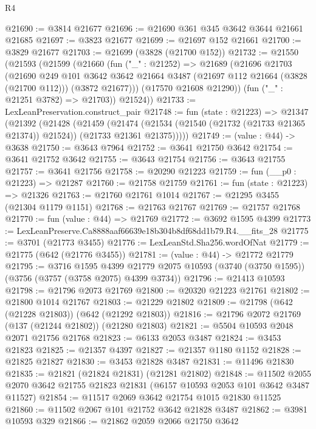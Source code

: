 \begin{lexlean}{R4}
\begin{coremodule}
@21690 := @3814 @21677
@21696 := @21690 @361 @345 @3642 @3644 @21661 @21685
@21697 := @3823 @21677
@21699 := @21697 @152 @21661
@21700 := @3829 @21677
@21703 := @21699 (@3828 (@21700 @152))
@21732 := @21550
    (@21593
      (@21599
        (@21660
          (fun ("_" : @21252) =>
          @21689
            (@21696
              @21703
              (@21690
                @249
                @101
                @3642
                @3642
                @21664
                @3487
                (@21697 @112 @21664 (@3828 (@21700 @112)))
                (@3872 @21677)))
            (@17570 @21608 @21290))
          (fun ("_" : @21251 @3782) => @21703))
        @21524))
@21733 := LexLeanPreservation.construct_pair
@21748 := fun (state : @21223) =>
  @21347
    (@21392
      (@21428
        (@21459
          (@21474
            (@21534 (@21540 (@21732 (@21733 @21365 @21374)) @21524))
            (@21733 @21361 @21375)))))
@21749 := (value : @44) -> @3638
@21750 := @3643 @7964
@21752 := @3641 @21750 @3642
@21754 := @3641 @21752 @3642
@21755 := @3643 @21754
@21756 := @3643 @21755
@21757 := @3641 @21756
@21758 := @20290 @21223
@21759 := fun (__p0 : @21223) => @21287
@21760 := @21758 @21759
@21761 := fun (state : @21223) => @21326
@21763 := @21760 @21761 @1014
@21767 := @21295 @3455 (@21304 @1179 @1151)
@21768 := @21763 @21767
@21769 := @21757 @21768
@21770 := fun (value : @44) => @21769
@21772 := @3692 @1595 @4399
@21773 := LexLeanPreserve.Ca8888aaf66639e18b304b8df68dd1b79.R4.__fits_28
@21775 := @3701 (@21773 @3455)
@21776 := LexLeanStd.Sha256.wordOfNat
@21779 := @21775 (@642 (@21776 @3455))
@21781 := (value : @44) -> @21772 @21779
@21795 := @3716
    @1595
    @4399
    @21779
    @2075
    @10593
    (@3740 (@3750 @1595))
    (@3756 (@3757 (@3758 @2075) @4399 @3734))
@21796 := @21413 @10593
@21798 := @21796 @2073 @21769
@21800 := @20320 @21223 @21761
@21802 := @21800 @1014 @21767
@21803 := @21229 @21802
@21809 := @21798 (@642 (@21228 @21803)) (@642 (@21292 @21803))
@21816 := @21796 @2072 @21769 (@137 (@21244 @21802)) (@21280 @21803)
@21821 := @5504 @10593 @2048 @2071 @21756 @21768
@21823 := @6133 @2053 @3487
@21824 := @3453 @21823
@21825 := @21357 @4397
@21827 := @21357 @1180 @1152
@21828 := @21825 @21827
@21830 := @3453 @21828 @3487
@21831 := @11496 @21830
@21835 := @21821 (@21824 @21831) (@21281 @21802)
@21848 := @11502 @2055 @2070 @3642 @21755 @21823 @21831 (@6157 @10593 @2053 @101 @3642 @3487 @11527)
@21854 := @11517 @2069 @3642 @21754 @1015 @21830 @11525
@21860 := @11502 @2067 @101 @21752 @3642 @21828 @3487
@21862 := @3981 @10593 @329
@21866 := @21862 @2059 @2066 @21750 @3642

\end{coremodule}
\end{lexlean}
